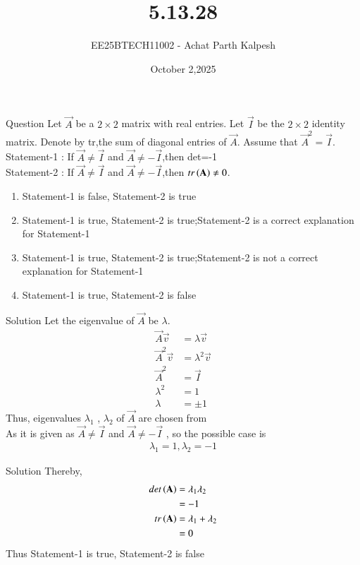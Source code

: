 \documentclass{beamer}
\title %
{5.13.28}
\date{October 2,2025}
\author %
{EE25BTECH11002 - Achat Parth Kalpesh}
\begin{document}
\frame{\titlepage}

\begin{frame}{Question}
Let $\vec{A}$ be a $2 \times 2$ matrix with real entries. Let 
 $\vec{I}$ be the $2 \times 2$ identity matrix. Denote by 
 tr,the sum of diagonal entries of $\vec{A}$. Assume
 that $\vec{A}^2 = \vec{I}$. \\
		Statement-1 : If $\vec{A} \neq \vec{I}$ and $\vec{A} \neq -
        \vec{I}$,then det=-1 \\
		Statement-2 : If $\vec{A} \neq \vec{I}$ and $\vec{A} \neq -
        \vec{I}$,then $tr\left(\mathbf{A}\right) \neq 0$.
		\begin{enumerate}
			\item Statement-1 is false, Statement-2 is true
			\item Statement-1 is true, Statement-2 is 
            true;Statement-2 is a correct explanation for 
            Statement-1
			\item Statement-1 is true, Statement-2 is 
            true;Statement-2 is not a correct explanation for 
            Statement-1
			\item Statement-1 is true, Statement-2 is false
		\end{enumerate}
\end{frame}
\begin{frame}{Solution}
Let the eigenvalue of  $\vec{A}$  be  $\lambda$.
\begin{align}
    \vec{A}\vec{v} &= \lambda \vec{v} \\
    \vec{A}^2 \vec{v} &= \lambda^2 \vec{v}\\
    \vec{A}^2 &= \vec{I}\\
    \lambda^2 &= 1 \\
    \lambda &= \pm 1
\end{align}
Thus, eigenvalues $\lambda_1$ , $\lambda_2$ of  $\vec{A}$  are chosen from  \\
As it is given as $\vec{A} \neq \vec{I}$ and $\vec{A} \neq -\vec{I}$ , so the possible case is
\begin{align}
    \lambda_1 = 1,\lambda_2 = -1
\end{align}
\end{frame}
\begin{frame}{Solution}
Thereby,
\begin{align}
    det\left(\mathbf{A}\right) &= \lambda_1 \lambda_2\\
    &= -1 \\
    tr\left(\mathbf{A}\right) &= \lambda_1 + \lambda_2 \\
    &= 0
\end{align}
Thus Statement-1 is true, Statement-2 is false
\end{frame}
\end{document}
